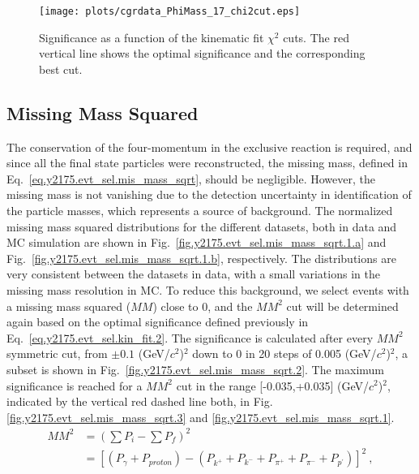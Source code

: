 \begin{figure}[H]
    \centering
        \texttt{[image: plots/cgrdata\_PhiMass\_17\_chi2cut.eps]}
        \caption{Significance as a function of the kinematic fit $\chi^{2}$ cuts. The red vertical line shows the optimal significance and the corresponding best cut.}
        \label{fig.y2175.evt_sel.kin_fit.3}
\end{figure}

\subsection{Missing Mass Squared}
\label{chap.y2175.evt_sel.mis_mass_sqrt}

The conservation of the four-momentum in the exclusive reaction is required, and since all the final state particles were reconstructed, the missing mass, defined in Eq.~\ref{eq.y2175.evt_sel.mis_mass_sqrt}, should be negligible. However, the missing mass is not vanishing due to the detection uncertainty in identification of the particle masses, which represents a source of background. The normalized missing mass squared distributions for the different datasets, both in data and MC simulation are shown in Fig.~\ref{fig.y2175.evt_sel.mis_mass_sqrt.1.a} and Fig.~\ref{fig.y2175.evt_sel.mis_mass_sqrt.1.b}, respectively. The distributions are very consistent between the datasets in data, with a small variations in the missing mass resolution in MC. To reduce this background, we select events with a missing mass squared ($MM$) close to 0, and the $MM^{2}$ cut will be determined again based on the optimal significance defined previously in Eq.~\ref{eq.y2175.evt_sel.kin_fit.2}. The significance is calculated after every $MM^{2}$ symmetric cut, from $\pm 0.1$ (GeV/$c^2$)$^2$ down to 0 in 20 steps of 0.005 (GeV/$c^2$)$^2$, a subset is shown in Fig.~\ref{fig.y2175.evt_sel.mis_mass_sqrt.2}. The maximum significance is reached for a $MM^{2}$ cut in the range [-0.035,+0.035] (GeV/$c^2$)$^2$, indicated by the vertical red dashed line both, in Fig.\ref{fig.y2175.evt_sel.mis_mass_sqrt.3} and \ref{fig.y2175.evt_sel.mis_mass_sqrt.1}.
\begin{equation}
    \label{eq.y2175.evt_sel.mis_mass_sqrt}
    \begin{aligned}
        MM^2 &= \left(\sum P_{i} - \sum P_{f}\right)^2 \\
             &= [(P_{\gamma} + P_{proton}) - (P_{k^+} + P_{k^-} + P_{\pi^+} + P_{\pi^-} + P_{p^{\prime}})]^2~,
    \end{aligned}    
\end{equation}

